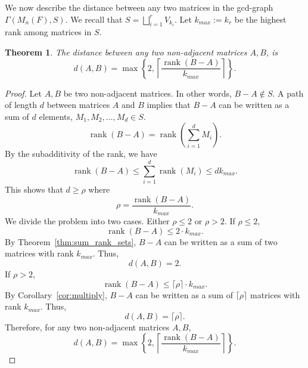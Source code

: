 \documentclass[12pt, a4paper]{amsart}
\newtheorem{thm}{Theorem}[section]
\theoremstyle{definition}
\newtheorem{expl}[thm]{Example}
\numberwithin{equation}{section}
\DeclareMathOperator{\rank}{rank}
\begin{document}
We now describe the distance between any two matrices in the gcd-graph $\Gamma(M_n(F), S).$ We recall that  $S = \bigsqcup_{i=1}^r V_{k_i}$. Let $k_{max}:=k_r$ be the highest rank among matrices in $S$.
\begin{thm} \label{thm:distance}
    The distance between any two non-adjacent matrices $A,B$, is
    \[d(A,B) = \max \left\{2, \left\lceil \frac{\rank(B-A)}{k_{max}} \right\rceil \right\}.\]
\end{thm}
\begin{proof}
    Let $A,B$ be two non-adjacent matrices. In other words, $B-A \not \in S$. A path of length $d$ between matrices $A$ and $B$ implies that $B - A$ can be written as a sum of $d$ elements, $M_1, M_2, \ldots, M_d \in S$.
    \[\rank(B-A) = \rank \left(\sum_{i=1}^{d} M_i\right).\]
    By the subadditivity of the rank, we have 
    \[ \rank(B-A) \leq \sum_{i=1}^d \rank(M_i) \leq d k_{max}. \] 
     This shows that $d \geq \rho$ where 
    \[\rho = \frac{\rank(B-A)}{k_{max}}.\]
    We divide the problem into two cases. Either $\rho \leq 2$ or $\rho>2$. If $\rho \leq 2$,
    \[\rank(B-A) \leq 2 \cdot k_{max}.\]
    By Theorem~\ref{thm:sum_rank_sets}, $B-A$ can be written as a sum of two matrices with rank $k_{max}$. Thus,
    \[d(A,B) = 2.\]
    If $\rho>2$,
    \[\rank(B-A) \leq \lceil \rho \rceil \cdot k_{max}.\]
    By Corollary~\ref{cor:multiply}, $B-A$ can be written as a sum of $\lceil \rho \rceil$ matrices with rank $k_{max}$. Thus,
    \[d(A,B) = \lceil \rho \rceil.\]
    Therefore, for any two non-adjacent matrices $A,B$,
    \[d(A,B) = \max \left\{2, \left\lceil \frac{\rank(B-A)}{k_{max}} \right\rceil \right\}.\]
\end{proof}
\end{document}
